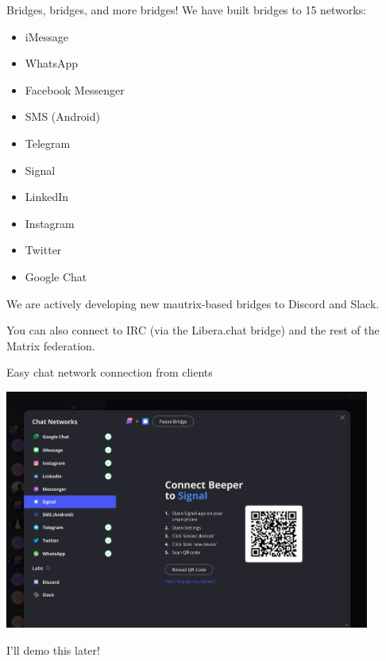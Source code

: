 \documentclass{beeper}
\begin{document}
\begin{frame}{Bridges, bridges, and more bridges!}
    We have built bridges to 15 networks:
    \begin{multicols}{2}
        \begin{itemize}
            \item iMessage
            \item WhatsApp
            \item Facebook Messenger
            \item SMS (Android)
            \item Telegram
            \item Signal
            \item LinkedIn
            \item Instagram
            \item Twitter
            \item Google Chat
        \end{itemize}
    \end{multicols}

    \pause
    We are actively developing new mautrix-based bridges to Discord and Slack.

    \pause
    You can also connect to IRC (via the Libera.chat bridge) and the rest of the
    Matrix federation.
\end{frame}

\begin{frame}{Easy chat network connection from clients}
    \centerline{\includegraphics[width=0.9\textwidth]{images/chat-networks-dialog}}

    I'll demo this later!
\end{frame}
\end{document}

